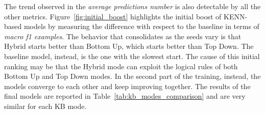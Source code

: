 The trend observed in the \textit{average predictions number} is also detectable by all the other metrics. Figure~\ref{fig:initial_boost} highlights the initial boost of KENN-based models by measuring the difference with respect to the baseline in terms of \textit{macro f1 examples}. The behavior that consolidates as the seeds vary is that Hybrid starts better than Bottom Up, which starts better than Top Down. The baseline model, instead, is the one with the slowest start. The cause of this initial ranking may be that the Hybrid mode can exploit the logical rules of both Bottom Up and Top Down modes. In the second part of the training, instead, the models converge to each other and keep improving together. The results of the final models are reported in Table~\ref{tab:kb_modes_comparison} and are very similar for each KB mode.
